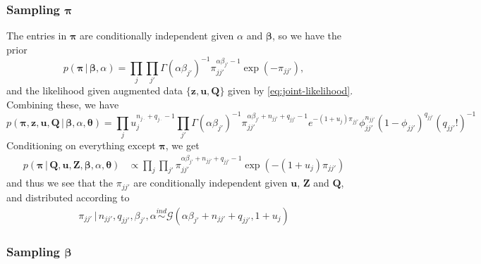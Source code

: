 \documentclass[12pt,letterpaper]{report}
\newcommand{\Gamm}[2]{\mathcal{G}(#1,#2)}
\newcommand{\given}{\, \vert \,}
\newcommand{\bQ}{\mathbf{Q}}
\newcommand{\bz}{\mathbf{z}}
\newcommand{\bZ}{\mathbf{Z}}
\newcommand{\bu}{\mathbf{u}}
\newcommand{\bbeta}{\boldsymbol{\beta}}
\newcommand{\btheta}{\boldsymbol{\theta}}
\newcommand{\bpi}{\boldsymbol{\pi}}
\begin{document}
\subsubsection{Sampling $\bpi$}

The entries in $\bpi$ are conditionally independent given $\alpha$ and
$\bbeta$, so we have the prior
\begin{equation}
  \label{eq:47}
  p(\bpi \given \bbeta, \alpha) = \prod_{j} \prod_{j'}
  \Gamma(\alpha\beta_{j'})^{-1}
  \pi_{jj'}^{\alpha\beta_{j'} - 1} \exp(-\pi_{jj'}),
\end{equation}
and the likelihood given augmented data $\{\bz, \bu, \bQ\}$ given by
\eqref{eq:joint-likelihood}.  Combining these, we have
\begin{equation}
  \label{eq:61}
  p(\bpi, \bz, \bu, \bQ \given \bbeta, \alpha, \btheta) =
  \prod_{j} u_j^{n_{j\cdot} + q_{j\cdot}
  - 1}\prod_{j'} 
  \Gamma(\alpha\beta_{j'})^{-1} \pi_{jj'}^{\alpha\beta_{j'} + n_{jj'}
    + q_{jj'} - 1} e^{-(1 + u_j)
    \pi_{jj'}} \phi_{jj'}^{n_{jj'}} (1-\phi_{jj'})^{q_{jj'}} (q_{jj'}!)^{-1}
\end{equation}
Conditioning on everything except $\bpi$, we get
\begin{align}
  \label{eq:24}
  p(\bpi \given \bQ, \bu, \bZ, \bbeta, \alpha, \btheta) &\propto \prod_j
  \prod_{j'} \pi_{jj'}^{\alpha\beta_{j'} + n_{jj'} + q_{jj'} - 1}
  \exp(-(1 + u_j)\pi_{jj'})
\end{align}
and thus we see that the $\pi_{jj'}$ are conditionally independent
given $\bu$, $\bZ$ and $\bQ$, and distributed according to
\begin{align}
  \label{eq:25}
  \pi_{jj'} \given n_{jj'}, q_{jj'}, \beta_{j'}, \alpha \stackrel{ind}{\sim}
  \Gamm{\alpha\beta_{j'} + n_{jj'} + q_{jj'}}{1 + u_j}
\end{align}


\subsubsection{Sampling $\bbeta$}
\label{sec:sampling-bbeta}
\end{document}
